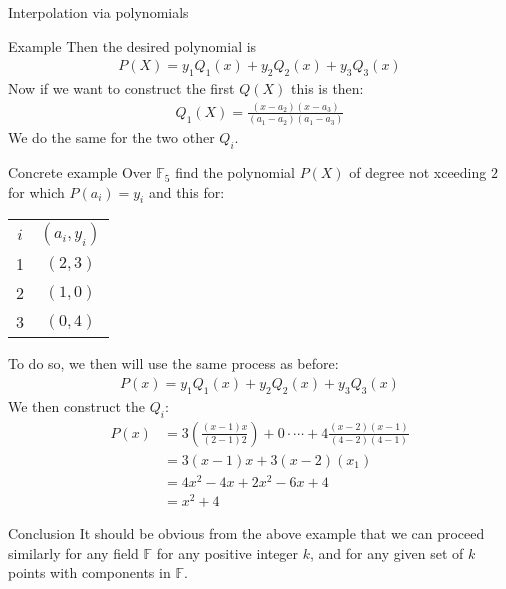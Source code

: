 \begin{parag}{Interpolation via polynomials}
\begin{subparag}{Example}
         Then the desired polynomial is
         \begin{align*} P\left(X\right) = y_1Q_1\left(x\right) + y_2Q_2\left(x\right) + y_3Q_3\left(x\right) \end{align*}
         Now if we want to construct the first $Q\left(X\right)$ this is then:
         \begin{align*} 
             Q_1\left(X\right) = \frac{\left(x - a_2\right)\left(x-a_3\right)}{\left(a_1 - a_2\right)\left(a_1 - a_3\right)}
         \end{align*}
         We do the same for the two other $Q_i$.
     \end{subparag}
     \begin{subparag}{Concrete example}
         Over $\mathbb{F}_5$ find the polynomial $P\left(X\right)$ of degree not xceeding $2$ for which $P\left(a_i\right) =  y_i$ and this for:
         \begin{center} \begin{tabular}{cc}$i$ & $\left(a_i, y_i\right)$ \\ 1 & $\left(2, 3\right)$ \\ 2 & $\left(1, 0\right)$ \\ 3 & $\left(0, 4\right)$ \end{tabular} \end{center} 
         To do so, we then will use the same process as before:
         \begin{align*} 
             P\left(x\right) = y_1Q_1\left(x\right) + y_2Q_2\left(x\right) + y_3Q_3\left(x\right)
         \end{align*}
         We then construct the $Q_i$:
         \begin{align*} 
             P\left(x\right) &= 3\left(\frac{\left(x-1\right)x}{\left(2-1\right)2}\right) + 0 \cdot  \cdots + 4\frac{\left(x-2\right)\left(x-1\right)}{\left(4-2\right)\left(4-1\right)}\\
             &= 3\left(x-1\right)x + 3\left(x-2\right)\left(x_1\right)\\
             &= 4x^2 - 4x + 2x^2 -6x + 4\\
             &= x^2 + 4
         \end{align*}
     \end{subparag}
 \end{parag}
 \begin{parag}{Conclusion}
     It should be obvious from the above example that we can proceed similarly for any field $\mathbb{F}$ for any positive integer $k$, and for any given set of $k$ points with components in $\mathbb{F}$.
 \end{parag}
